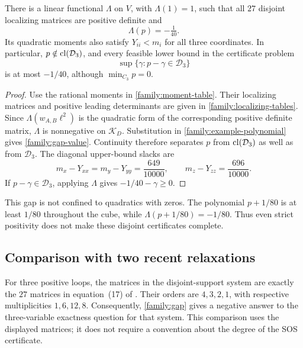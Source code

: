 \begin{proposition}
\label{family:gap}
There is a linear functional $\Lambda$ on $V$, with $\Lambda(1)=1$, such
that all $27$ disjoint localizing matrices are positive definite and
\begin{equation}
\label{family:gap-value}
\Lambda(p)=-\tfrac1{40}.
\end{equation}
Its quadratic moments also satisfy $Y_{ii}<m_i$ for all three coordinates.
In particular, $p\notin\operatorname{cl}(\mathcal D_3)$, and every feasible lower bound
in the certificate problem
\[
\sup\{\gamma:p-\gamma\in\mathcal D_3\}
\]
is at most $-1/40$, although $\min_{C_3}p=0$.
\end{proposition}

\begin{proof}
Use the rational moments in \cref{family:moment-table}. Their localizing
matrices and positive leading determinants are given in
\cref{family:localizing-tables}. Since
$\Lambda(w_{A,B}\ell^2)$ is the quadratic form of the corresponding
positive definite matrix, $\Lambda$ is nonnegative on $\mathcal K_D$.
Substitution in \eqref{family:example-polynomial} gives
\eqref{family:gap-value}. Continuity therefore separates $p$ from
$\operatorname{cl}(\mathcal D_3)$ as well as from $\mathcal D_3$.
The diagonal upper-bound slacks are
\[
m_x-Y_{xx}=m_y-Y_{yy}=\frac{649}{10000},\qquad
m_z-Y_{zz}=\frac{696}{10000}.
\]
If $p-\gamma\in\mathcal D_3$, applying $\Lambda$ gives
$-1/40-\gamma\ge0$.
\end{proof}

This gap is not confined to quadratics with zeros. The polynomial
$p+1/80$ is at least $1/80$ throughout the cube, while
$\Lambda(p+1/80)=-1/80$. Thus even strict positivity does not make these
disjoint certificates complete.

\subsection{Comparison with two recent relaxations}
\label{family:comparison-subsection}

For three positive loops, the matrices in the disjoint-support system are
exactly the $27$ matrices in equation~(17) of
\citet{Khajavirad2026SparseBoxQP}. Their orders are $4,3,2,1$, with respective
multiplicities $1,6,12,8$. Consequently,
\cref{family:gap} gives a negative answer to the three-variable exactness
question for that system. This comparison uses the displayed matrices;
it does not require a convention about the degree of the SOS certificate.


